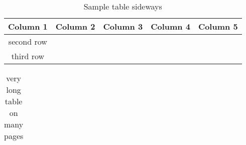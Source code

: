 \clearpage
\newpage




\begin{sidewaystable}[ht]
	\caption{Sample table sideways}
	\label{tab2}
	\centering
	\begin{tabular}{|c|c|c|c|c|}
		
		\hline
		Column 1 & Column 2 & Column 3 & Column 4 & Column 5 \\
		\hline
		second row & & & & \\
		\hline
		third row & & & & \\
		\hline
	\end{tabular}
\end{sidewaystable}


\clearpage
\newpage

\begin{longtable}{p{3cm}p{3cm}p{2cm}p{2.5cm}p{1.5cm}}
	\caption{very long table on many pages}
	\label{longtable}
	
	\\
	

\end{longtable}
